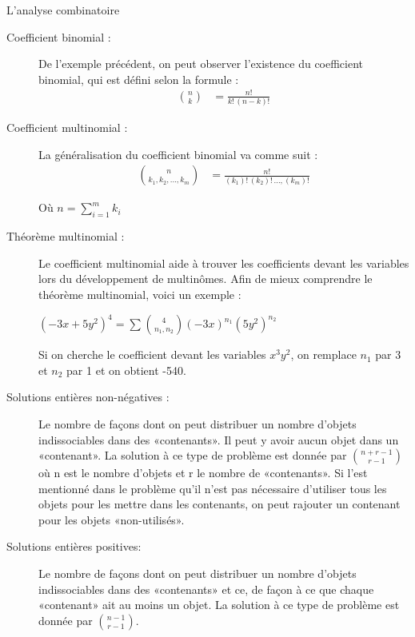 \documentclass[10pt, french]{article}
\begin{document}
\begin{multicols*}{3}
\begin{probch1}{L'analyse combinatoire}
\begin{description}
	 \item[Coefficient binomial :] De l'exemple précédent, on peut observer l'existence du coefficient binomial, qui est défini selon la formule :
	 \begin{align*}
	 \binom{n}{k}
	 &= \frac{n!}{k! \,(n-k)!}
	 \end{align*}
\end{description}
\begin{description}
  \item[Coefficient multinomial :] La généralisation du coefficient binomial va comme suit :
  \begin{align*}
  \binom{n}{k_1, k_2, ..., k_m}
  &= \frac{n!}{(k_1)! \, (k_2)! \, ..., (k_m)!}
  \end{align*}
  \item[] Où {$n = \sum_{i = 1}^{m} k_i$}
  \item[Théorème multinomial :] Le coefficient multinomial aide à trouver les coefficients devant les variables lors du développement de multinômes. Afin de mieux comprendre le théorème multinomial, voici un exemple :
  \item[]{$(-3x+5y^2)^4 = \sum_{}^{} \binom{4}{n_1 , n_2} (-3x)^{n_1} (5y^{2})^{n_2}$}
  \item[] Si on cherche le coefficient devant les variables $x^{3}y^{2}$, on remplace $n_1$ par 3 et $n_2$ par 1 et on obtient -540.
\end{description}  
\begin{description}
  \item[Solutions entières non-négatives :] Le nombre de façons dont on peut distribuer un nombre d'objets indissociables dans des «contenants». Il peut y avoir aucun objet dans un «contenant». La solution à ce type de problème est donnée par $\binom{n+r-1}{r-1}$ où n est le nombre d'objets et r le nombre de «contenants». Si l'est mentionné dans le problème qu'il n'est pas nécessaire d'utiliser tous les objets pour les mettre dans les contenants, on peut rajouter un contenant pour les objets «non-utilisés».
  \item[Solutions entières positives:] Le nombre de façons dont on peut distribuer un nombre d'objets indissociables dans des «contenants» et ce, de façon à ce que chaque «contenant» ait au moins un objet. La solution à ce type de problème est donnée par $\binom{n-1}{r-1}$.
\end{description}
\end{probch1}


\end{multicols*}
\end{document}
